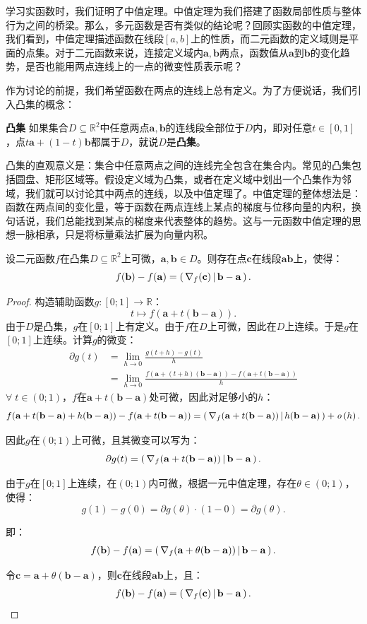 \documentclass[12pt,UTF8]{ctexbook}
\begin{document}
学习实函数时，我们证明了中值定理。中值定理为我们搭建了函数局部性质与整体行为之间的桥梁。那么，多元函数是否有类似的结论呢？回顾实函数的中值定理，我们看到，中值定理描述函数在线段$[a,b]$上的性质，而二元函数的定义域则是平面的点集。对于二元函数来说，连接定义域内$\mathbf{a}, \mathbf{b}$两点，函数值从$\mathbf{a}$到$\mathbf{b}$的变化趋势，是否也能用两点连线上的一点的微变性质表示呢？

作为讨论的前提，我们希望函数在两点的连线上总有定义。为了方便说话，我们引入凸集的概念：
\begin{df}{\textbf{凸集}}
如果集合$D\subseteq \mathbb{R}^2$中任意两点$\mathbf{a},\mathbf{b}$的连线段全部位于$D$内，即对任意$t\in[0,1]$，点$t\mathbf{a}+(1-t)\mathbf{b}$都属于$D$，就说$D$是\textbf{凸集}。
\end{df}

凸集的直观意义是：集合中任意两点之间的连线完全包含在集合内。常见的凸集包括圆盘、矩形区域等。假设定义域为凸集，或者在定义域中划出一个凸集作为邻域，我们就可以讨论其中两点的连线，以及中值定理了。中值定理的整体想法是：函数在两点间的变化量，等于函数在两点连线上某点的梯度与位移向量的内积，换句话说，我们总能找到某点的梯度来代表整体的趋势。这与一元函数中值定理的思想一脉相承，只是将标量乘法扩展为向量内积。

\begin{tm}
设二元函数$f$在凸集$D\subseteq \mathbb{R}^2$上可微，$\mathbf{a},\mathbf{b}\in D$。则存在点$\mathbf{c}$在线段$\mathbf{ab}$上，使得：
$$f(\mathbf{b})-f(\mathbf{a})=\displaystyle\left( \,\nabla_f(\mathbf{c}) \,\middle\vert \,\mathbf{b}-\mathbf{a} \,\right).$$
\end{tm}

\begin{proof}
构造辅助函数$g:[0;1]\to\mathbb{R}$：
$$t \mapsto f(\mathbf{a}+t(\mathbf{b}-\mathbf{a})).$$
由于$D$是凸集，$g$在$[0;1]$上有定义。由于$f$在$D$上可微，因此在$D$上连续。于是$g$在$[0;1]$上连续。计算$g$的微变：
\begin{align*}
\partial g(t)&=\lim_{h\to 0}\frac{g(t+h)-g(t)}{h}\\
&=\lim_{h\to 0}\frac{f(\mathbf{a}+(t+h)(\mathbf{b}-\mathbf{a}))-f(\mathbf{a}+t(\mathbf{b}-\mathbf{a}))}{h}
\end{align*}
$\forall \; t\in(0;1)$，$f$在$\mathbf{a}+t(\mathbf{b}-\mathbf{a})$处可微，因此对足够小的$h$：
$$f(\mathbf{a}+t(\mathbf{b}-\mathbf{a})+h(\mathbf{b}-\mathbf{a}))-f(\mathbf{a}+t(\mathbf{b}-\mathbf{a}))=\displaystyle\left( \,\nabla_f(\mathbf{a}+t(\mathbf{b}-\mathbf{a})) \,\middle\vert \,h(\mathbf{b}-\mathbf{a}) \,\right)+\mathit{o}\left(h\right).$$

因此$g$在$(0;1)$上可微，且其微变可以写为：
$$\partial g(t)=\displaystyle\left( \,\nabla_f(\mathbf{a}+t(\mathbf{b}-\mathbf{a})) \,\middle\vert \,\mathbf{b}-\mathbf{a} \,\right).$$

由于$g$在$[0;1]$上连续，在$(0;1)$内可微，根据一元中值定理，存在$\theta\in(0;1)$，使得：
$$g(1)-g(0)=\partial g(\theta)\cdot(1-0) = \partial g(\theta).$$

即：
$$f(\mathbf{b})-f(\mathbf{a})=\displaystyle\left( \,\nabla_f(\mathbf{a}+\theta(\mathbf{b}-\mathbf{a})) \,\middle\vert \,\mathbf{b}-\mathbf{a} \,\right).$$

令$\mathbf{c}=\mathbf{a}+\theta(\mathbf{b}-\mathbf{a})$，则$\mathbf{c}$在线段$\mathbf{ab}$上，且：
$$f(\mathbf{b})-f(\mathbf{a})=\displaystyle\left( \,\nabla_f(\mathbf{c}) \,\middle\vert \,\mathbf{b}-\mathbf{a} \,\right).$$
\end{proof}
\end{document}
